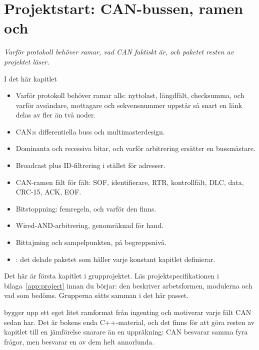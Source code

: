 
\chapter{Projektstart: CAN-bussen, ramen och }
\label{c10:ch}

{\large\itshape Varför protokoll behöver ramar, vad CAN faktiskt är, och paketet resten av projektet
läser.\par}

\begin{chapterbox}{I det här kapitlet}
\begin{itemize}
  \item Varför protokoll behöver ramar alls: nyttolast, längdfält, checksumma, och varför
    avsändare, mottagare och sekvensnummer uppstår så snart en länk delas av fler än två noder.
  \item CAN:s differentiella buss och multimasterdesign.
  \item Dominanta och recessiva bitar, och varför arbitrering ersätter en bussmästare.
  \item Broadcast plus ID-filtrering i stället för adresser.
  \item CAN-ramen fält för fält: SOF, identifierare, RTR, kontrollfält, DLC, data, CRC-15, ACK,
    EOF.
  \item Bitstoppning: femregeln, och varför den finns.
  \item Wired-AND-arbitrering, genomräknad för hand.
  \item Bittajming och sampelpunkten, på begreppsnivå.
  \item {}: det delade paketet som håller varje konstant kapitlet definierar.
\end{itemize}
\end{chapterbox}

Det här är första kapitlet i grupprojektet. Läs projektspecifikationen i bilaga~\ref{app:project}
innan du börjar: den beskriver arbetsformen, modulerna och vad som bedöms. Grupperna sätts samman i
det här passet.

 bygger upp ett eget litet ramformat från ingenting och motiverar varje fält
CAN sedan har. Det är bokens enda C++-material, och det finns för att göra resten av kapitlet till
en jämförelse snarare än en uppräkning: CAN besvarar samma fyra frågor, men besvarar en av dem helt
annorlunda.

